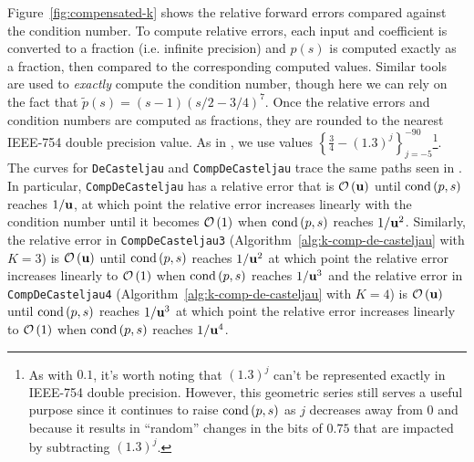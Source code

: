 Figure~\ref{fig:compensated-k} shows the relative forward errors compared
against the condition number. To compute relative errors, each input and
coefficient is converted to a fraction (i.e. infinite precision) and
\(p(s)\) is computed exactly as a fraction, then
compared to the corresponding computed values. Similar tools are used to
\emph{exactly} compute the condition number, though here we can rely
on the fact that \(\widetilde{p}(s) = (s - 1)
\left(s/2 - 3/4\right)^7\). Once the relative errors and
condition numbers are computed as fractions, they are rounded to the
nearest IEEE-754 double precision value. As in \cite{Jiang2010}, we use
values \(\left\{\frac{3}{4} - (1.3)^j\right\}_{j=-5}^{-90}\)\footnote{As with
\(0.1\), it's worth noting that \((1.3)^j\) can't be represented exactly in
IEEE-754 double precision. However, this geometric series still serves a
useful purpose since it continues to raise \(\operatorname{cond}\left(p, s\right)\) as \(j\) decreases
away from \(0\) and because it results in ``random'' changes in the bits of
\(0.75\) that are impacted by subtracting \((1.3)^j\).}. The curves for
\texttt{DeCasteljau} and \texttt{CompDeCasteljau} trace the same paths seen
in \cite{Jiang2010}. In particular, \texttt{CompDeCasteljau} has a relative
error that is \(\mathcal{O}\left(\mathbf{u}\right)\) until \(\operatorname{cond}\left(p, s\right)\) reaches
\(1 / \mathbf{u}\), at which point the relative error increases linearly with
the condition number until it becomes \(\mathcal{O}\left(1\right)\) when
\(\operatorname{cond}\left(p, s\right)\) reaches \(1 / \mathbf{u}^2\).
Similarly, the relative error in \texttt{CompDeCasteljau3}
(Algorithm~\ref{alg:k-comp-de-casteljau} with \(K = 3\))
is \(\mathcal{O}\left(\mathbf{u}\right)\) until \(\operatorname{cond}\left(p, s\right)\) reaches
\(1 / \mathbf{u}^2\) at which point the relative error increases linearly
to \(\mathcal{O}\left(1\right)\) when \(\operatorname{cond}\left(p, s\right)\) reaches \(1 / \mathbf{u}^3\)
and the relative error in \texttt{CompDeCasteljau4}
(Algorithm~\ref{alg:k-comp-de-casteljau} with \(K = 4\))
is \(\mathcal{O}\left(\mathbf{u}\right)\) until \(\operatorname{cond}\left(p, s\right)\) reaches
\(1 / \mathbf{u}^3\) at which point the relative error increases linearly
to \(\mathcal{O}\left(1\right)\) when \(\operatorname{cond}\left(p, s\right)\) reaches \(1 / \mathbf{u}^4\).
